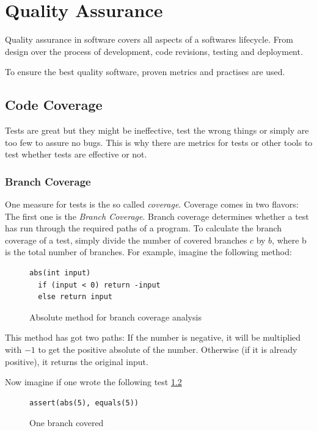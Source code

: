 \chapter{Quality Assurance}

Quality assurance in software covers all aspects of a softwares lifecycle.
From design over the process of development, code revisions, testing and
deployment.

To ensure the best quality software, proven metrics and practises are used.

\section{Code Coverage}

Tests are great but they might be ineffective, test the wrong things
or simply are too few to assure no bugs. This is why there are metrics
for tests or other tools to test whether tests are effective or not.

\subsection{Branch Coverage}

One measure for tests is the so called \textit{coverage}. Coverage
comes in two flavors: The first one is the \textit{Branch Coverage}.
Branch coverage determines whether a test has run through the
required paths of a program. To calculate the branch coverage of a test,
simply divide the number of covered branches $c$ by $b$, where b is the
total number of branches. For example, imagine the following
method:

\begin{figure}
\begin{lstlisting}
abs(int input)
  if (input < 0) return -input
  else return input
\end{lstlisting}
\caption{Absolute method for branch coverage analysis}
\label{code:branchCoverage}
\end{figure}

This method has got two paths: If the number is negative, it will
be multiplied with $-1$ to get the positive absolute of the number.
Otherwise (if it is already positive), it returns the original input.

Now imagine if one wrote the following test \ref{code:oneBranch}

\begin{figure}
\begin{lstlisting}
assert(abs(5), equals(5))
\end{lstlisting}
\caption{One branch covered}
\label{code:oneBranch}
\end{figure}

